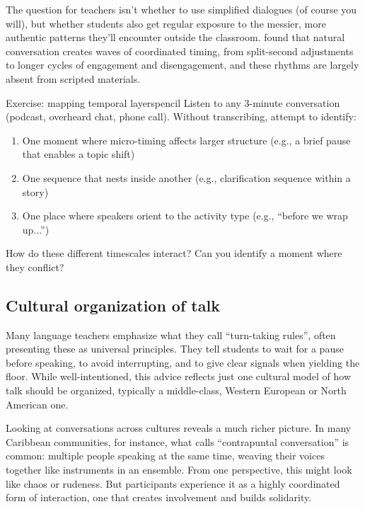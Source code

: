 The question for teachers isn't whether to use simplified dialogues (of course you will), but whether students also get regular exposure to the messier, more authentic patterns they'll encounter outside the classroom. \citet{wilson2005} found that natural conversation creates waves of coordinated timing, from split-second adjustments to longer cycles of engagement and disengagement, and these rhythms are largely absent from scripted materials.

\begin{tblsframedsymbol}{Exercise: mapping temporal layers}{pencil}
Listen to any 3-minute conversation (podcast, overheard chat, phone call). Without transcribing, attempt to identify:
\begin{enumerate}[noitemsep, leftmargin=*]
    \item One moment where micro-timing affects larger structure (e.g., a brief pause that enables a topic shift)
    \item One sequence that nests inside another (e.g., clarification sequence within a story)
    \item One place where speakers orient to the activity type (e.g., \enquote{before we wrap up...})
\end{enumerate}
How do these different timescales interact? Can you identify a moment where they conflict?
\end{tblsframedsymbol}

\subsection{Cultural organization of talk} \label{subsec:cultural-org}

Many language teachers emphasize what they call \enquote{turn-taking rules}, often presenting these as universal principles. They tell students to wait for a pause before speaking, to avoid interrupting, and to give clear signals when yielding the floor. While well-intentioned, this advice reflects just one cultural model of how talk should be organized, typically a middle-class, Western European or North American one.

Looking at conversations across cultures reveals a much richer picture. In many Caribbean communities, for instance, what \citet{reisman1974} calls \enquote{contrapuntal conversation} is common: multiple people speaking at the same time, weaving their voices together like instruments in an ensemble. From one perspective, this might look like chaos or rudeness. But participants experience it as a highly coordinated form of interaction, one that creates involvement and builds solidarity.

